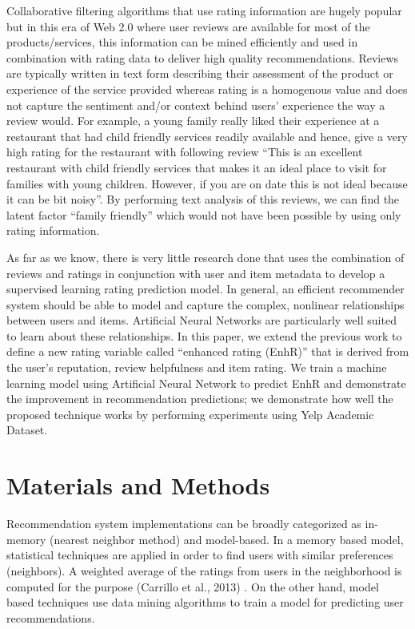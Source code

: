 \documentclass[12pt]{article}
\begin{document}
Collaborative filtering algorithms that use rating information are hugely popular but in this era of Web 2.0 where user reviews are available for most of the products/services, this information can be mined efficiently and used in combination with rating data to deliver high quality recommendations. Reviews are typically written in text form describing their assessment of the product or experience of the service provided whereas rating is a homogenous value and does not capture the sentiment and/or context behind users' experience the way a review would. For example, a young family really liked their experience at a restaurant that had child friendly services readily available and hence, give a very high rating for the restaurant with following review ``This is an excellent restaurant with child friendly services that makes it an ideal place to visit for families with young children. However, if you are on date this is not ideal because it can be bit noisy''. By performing text analysis of this reviews, we can find the latent factor ``family friendly'' which would not have been possible by using only rating information. 

As far as we know, there is very little research done that uses the combination of reviews and ratings in conjunction with user and item metadata to develop a supervised learning rating prediction model. In general, an efficient recommender system should be able to model and capture the complex, nonlinear relationships between users and items. Artificial Neural Networks are particularly well suited to learn about these relationships. In this paper, we extend the previous work to define a new rating variable called ``enhanced rating (EnhR)'' that is derived from the user's reputation, review helpfulness and item rating. We train a machine learning model using Artificial Neural Network to predict EnhR and demonstrate the improvement in recommendation predictions; we demonstrate how well the proposed technique works by performing experiments using Yelp Academic Dataset.

\newpage\section{Materials and Methods}

Recommendation system implementations can be broadly categorized as in-memory (nearest neighbor method) and model-based. In a memory based model, statistical techniques are applied in order to find users with similar preferences (neighbors). A weighted average of the ratings from users in the neighborhood is computed for the purpose (Carrillo et al., 2013) \cite{carrillo}. On the other hand, model based techniques use data mining algorithms to train a model for predicting user recommendations.
\end{document}
